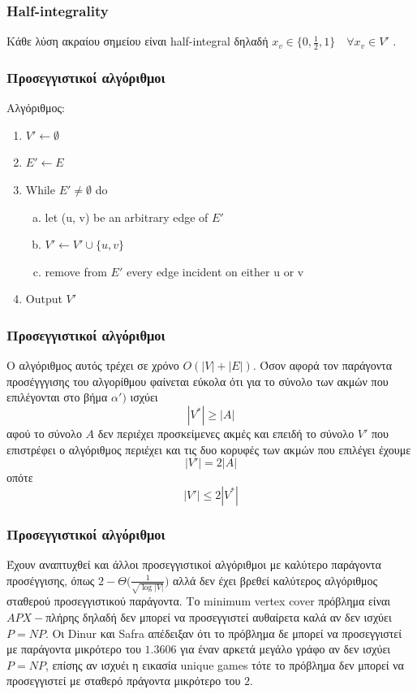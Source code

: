 \documentclass[greek]{beamer}
\begin{document}

\begin{frame}
\frametitle{Half-integrality}
Kάθε λύση ακραίου σημείου είναι half-integral δηλαδή $x_v \in{\{0, \frac{1}{2}, 1\}} \quad \forall x_v \in V'$ \cite{AppAlg}.
\end{frame}


\begin{frame}
\frametitle{Προσεγγιστικοί αλγόριθμοι}
Αλγόριθμος:
\begin{enumerate}
\item $ V' \leftarrow \emptyset $
\item $ E' \leftarrow E$
\item While $ E' \neq {\emptyset} $ do
\begin{enumerate}[a)]
\item let (u, v) be an arbitrary edge of $E'$
\item $V' \leftarrow V' \cup \{u,v\}$
\item remove from $E'$ every edge incident on either u or v 
\end{enumerate}
\item Output $V'$
\end{enumerate}
\end{frame}

\begin{frame}
\frametitle{Προσεγγιστικοί αλγόριθμοι}
Ο αλγόριθμος αυτός τρέχει σε χρόνο $O(|V| + |E|)$\cite{IntAlg}. Όσον αφορά τον παράγοντα προσέγγγισης του αλγορίθμου φαίνεται εύκολα ότι για το σύνολο των ακμών που επιλέγονται στο βήμα $\alpha')$ ισχύει 
$$|V^{*}| \geq |A|$$ 
αφού το σύνολο $Α$ δεν περιέχει προσκείμενες ακμές και επειδή το σύνολο $V'$ που επιστρέφει ο αλγόριθμος περιέχει και τις δυο κορυφές των ακμών που επιλέγει έχουμε 
$$|V'| = 2|A|$$ 
οπότε 
$$|V'| \leq 2|V^{*}|$$ 
\end{frame}


\begin{frame}
\frametitle{Προσεγγιστικοί αλγόριθμοι}
Έχουν αναπτυχθεί και άλλοι προσεγγιστικοί αλγόριθμοι με καλύτερο παράγοντα προσέγγισης, όπως $2-\Theta\Big(\frac{1}{\sqrt{\log{|V|}}}\Big)$\cite{BetterAppr} αλλά δεν έχει βρεθεί καλύτερος αλγόριθμος σταθερού προσεγγιστικού παράγοντα. Το minimum vertex cover πρόβλημα είναι $APX-$πλήρης δηλαδή δεν μπορεί να προσεγγιστεί αυθαίρετα καλά αν δεν ισχύει $P=NP$. Οι Dinur και Safra απέδειξαν ότι το πρόβλημα δε μπορεί να προσεγγιστεί με παράγοντα μικρότερο του $1.3606$ για έναν αρκετά μεγάλο γράφο αν δεν ισχύει $P=NP$, επίσης αν ισχυέι η εικασία unique games τότε το πρόβλημα δεν μπορεί να προσεγγιστεί με σταθερό πράγοντα μικρότερο του $2$.
\end{frame}
\end{document}

